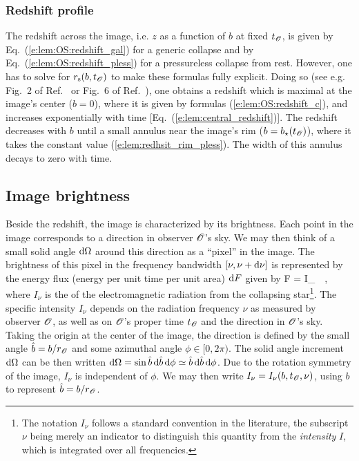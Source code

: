 \subsubsection{Redshift profile}

The redshift across the image, i.e. $z$ as a function of $b$ at fixed $t_{\mathscr{O}}$,
is given by Eq.~(\ref{e:lem:OS:redshift_gal}) for a generic collapse
and by Eq.~(\ref{e:lem:OS:redshift_pless}) for a pressureless collapse
from rest. However, one has to solve for $r_{\rm s}(b, t_{\mathscr{O}})$ to make
these formulas fully explicit. Doing so (see e.g. Fig.~2 of Ref.~\cite{LakeR79} or
Fig.~6 of Ref.~\cite{YoshiTN19}), one obtains a redshift which is maximal
at the image's center ($b=0$), where it is given by formulas (\ref{e:lem:OS:redshift_c}),
and increases exponentially with time [Eq.~(\ref{e:lem:central_redshift})].
The redshift decreases with $b$ until a small annulus near the image's rim
($b = b_\star(t_{\mathscr{O}})$),
where it
takes the constant value (\ref{e:lem:redhsit_rim_pless}). The width of
this annulus decays to zero with time.


\subsection{Image brightness}

Beside the redshift, the image is characterized by its brightness.
Each point in the image corresponds to a direction in observer $\mathscr{O}$'s sky.
We may then think of a small solid angle $\mathrm{d}\Omega$ around this direction
as a ``pixel'' in the image. The brightness of this pixel
in the frequency bandwidth $[\nu, \nu + \mathrm{d}\nu]$ is represented by the
energy flux (energy per unit time per unit area)
$\mathrm{d} F$ given by
\be \label{e:lem:elem_flux}
   \D F = I_\nu \, \D\Omega \, \D\nu ,
\ee
where $I_\nu$ is the 
of the electromagnetic
radiation from the collapsing star\footnote{The notation $I_\nu$ follows
a standard convention in the literature, the subscript $\nu$ being merely an indicator to
distinguish this quantity from the \emph{intensity} $I$, which is integrated over
all frequencies.}.
The specific intensity $I_\nu$
depends on the radiation frequency $\nu$
as measured by observer $\mathscr{O}$, as well
as on $\mathscr{O}$'s proper time $t_{\mathscr{O}}$ and the direction in $\mathscr{O}$'s sky.
Taking the origin at the center of the image, the direction is defined
by the small angle $\hat{b} = b / r_{\mathscr{O}}$ and some azimuthal angle $\phi\in [0,2\pi)$. %
The solid angle increment $\mathrm{d}\Omega$ can be then written
$\mathrm{d} \Omega = \sin\hat{b}\, \mathrm{d}\hat{b}\, \mathrm{d}\phi \simeq \hat{b}\, \mathrm{d}\hat{b}\, \mathrm{d}\phi$.
Due to the rotation symmetry of the image, $I_\nu$ is independent of $\phi$. We may then
write $I_\nu = I_\nu(b, t_{\mathscr{O}}, \nu)$, using $b$ to represent $\hat{b} = b / r_{\mathscr{O}}$.

